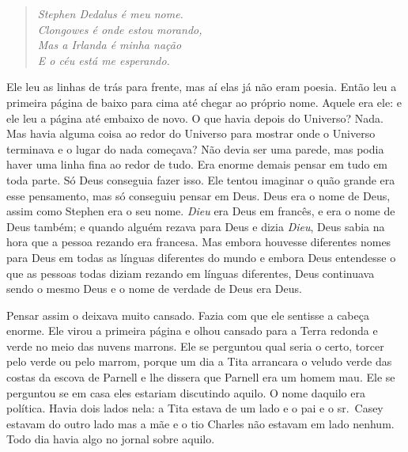 \begin{verse}\itshape
Stephen Dedalus é meu nome.\\
Clongowes é onde estou morando,\\
Mas a Irlanda é minha nação\\
E o céu está me esperando.
\end{verse}

Ele leu as linhas de trás para frente, mas aí elas já não eram poesia.
Então leu a primeira página de baixo para cima até chegar ao próprio
nome. Aquele era ele: e ele leu a página até embaixo de novo. O que
havia depois do Universo? Nada. Mas havia alguma coisa ao redor do
Universo para mostrar onde o Universo terminava e o lugar do nada
começava? Não devia ser uma parede, mas podia haver uma linha fina ao
redor de tudo. Era enorme demais pensar em tudo em toda parte. Só Deus
conseguia fazer isso. Ele tentou imaginar o quão grande era esse
pensamento, mas só conseguiu pensar em Deus. Deus era o nome de Deus,
assim como Stephen era o seu nome. \textit{Dieu} era Deus em francês, e
era o nome de Deus também; e quando alguém rezava para Deus e dizia
\textit{Dieu}, Deus sabia na hora que a pessoa rezando era
francesa. Mas embora houvesse diferentes nomes para Deus em todas as
línguas diferentes do mundo e embora Deus entendesse o que as pessoas
todas diziam rezando em línguas diferentes, Deus continuava sendo o
mesmo Deus e o nome de verdade de Deus era Deus.

Pensar assim o deixava muito cansado. Fazia com que ele sentisse a
cabeça enorme. Ele virou a primeira página e olhou cansado para a Terra
redonda e verde no meio das nuvens marrons. Ele se perguntou qual seria
o certo, torcer pelo verde ou pelo marrom, porque um dia a Tita
arrancara o veludo verde das costas da escova de Parnell e lhe dissera
que Parnell era um homem mau. Ele se perguntou se em casa eles estariam
discutindo aquilo. O nome daquilo era política. Havia dois lados nela:
a Tita estava de um lado e o pai e o sr.~Casey estavam do outro lado
mas a mãe e o tio Charles não estavam em lado nenhum. Todo dia havia
algo no jornal sobre aquilo.

